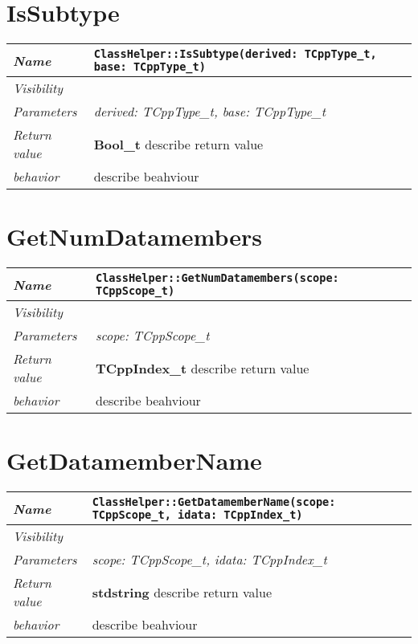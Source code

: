  \section{IsSubtype}
\begin{longtable}{p{3cm} @{\hskip 1cm} p{12cm}}
 \hline
\textit{Name} & \texttt{ClassHelper::IsSubtype(derived: TCppType_t, base: TCppType_t)}\\
\hline
 \textit{Visibility} & \\
\hline
\textit{Parameters} & \textit{derived: TCppType_t, base: TCppType_t}\\
\hline
\textit{Return value} & \textbf{ Bool_t} describe return value\\
  \hline
 \textit{behavior} & describe beahviour \\
\hline
\end{longtable} \pagebreak
 \section{GetNumDatamembers}
\begin{longtable}{p{3cm} @{\hskip 1cm} p{12cm}}
 \hline
\textit{Name} & \texttt{ClassHelper::GetNumDatamembers(scope: TCppScope_t)}\\
\hline
 \textit{Visibility} & \\
\hline
\textit{Parameters} & \textit{scope: TCppScope_t}\\
\hline
\textit{Return value} & \textbf{ TCppIndex_t} describe return value\\
  \hline
 \textit{behavior} & describe beahviour \\
\hline
\end{longtable} \pagebreak
 \section{GetDatamemberName}
\begin{longtable}{p{3cm} @{\hskip 1cm} p{12cm}}
 \hline
\textit{Name} & \texttt{ClassHelper::GetDatamemberName(scope: TCppScope_t, idata: TCppIndex_t)}\\
\hline
 \textit{Visibility} & \\
\hline
\textit{Parameters} & \textit{scope: TCppScope_t, idata: TCppIndex_t}\\
\hline
\textit{Return value} & \textbf{ stdstring} describe return value\\
  \hline
 \textit{behavior} & describe beahviour \\
\hline
\end{longtable} \pagebreak
